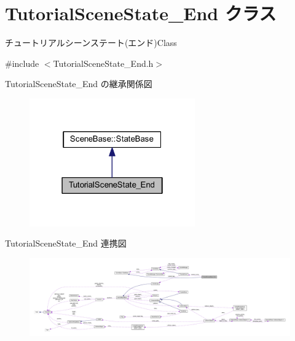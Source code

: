 \hypertarget{class_tutorial_scene_state___end}{}\section{Tutorial\+Scene\+State\+\_\+\+End クラス}
\label{class_tutorial_scene_state___end}


チュートリアルシーンステート(エンド)Class  




{\ttfamily \#include $<$Tutorial\+Scene\+State\+\_\+\+End.\+h$>$}



Tutorial\+Scene\+State\+\_\+\+End の継承関係図
\nopagebreak
\begin{figure}[H]
\begin{center}
\leavevmode
\includegraphics[width=202pt]{class_tutorial_scene_state___end__inherit__graph}
\end{center}
\end{figure}


Tutorial\+Scene\+State\+\_\+\+End 連携図
\nopagebreak
\begin{figure}[H]
\begin{center}
\leavevmode
\includegraphics[width=350pt]{class_tutorial_scene_state___end__coll__graph}
\end{center}
\end{figure}
